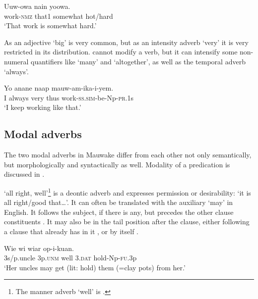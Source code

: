 \ea%
\label{ex:3:x703}
\gll Uuw-owa nain   yoowa. \\
work-\textsc{nmz} that1 somewhat hot/hard\\
\glt`That work is somewhat hard.'
\z

As an adjective  `big' is very common, but as an intensity adverb `very' it is very restricted in its distribution.  cannot modify a verb, but it can intensify some non-numeral quantifiers like  `many' and  `altogether', as well as the temporal adverb  `always'. 

\ea%
\label{ex:3:x509}
\gll Yo anane  naap mauw-am-ika-i-yem. \\
I always very thus work-\textsc{ss}.\textsc{sim}-be-Np-\textsc{pr}.1s\\
\glt`I  keep working like that.'
\z

\subsection{Modal adverbs}\label{sec:3:y:x}
{}
The two modal adverbs in Mauwake differ from each other not only semantically, but morphologically and syntactically as well. Modality of a predication is discussed in .

 `all right, well'\footnote{The manner adverb `well' is .} is a deontic adverb and expresses permission or desirability: `it is all right/good that{\dots}'. It can often be translated with the auxiliary `may' in English. It follows the subject, if there is any, but precedes the other clause constituents . It may also be in the tail position after the clause, either following a clause that already has  in it , or by itself . 

\ea%
\label{ex:3:x514}
\gll Wie wi  wiar op-i-kuan. \\
3s/p.uncle 3p.\textsc{unm} well 3.\textsc{dat} hold-Np-\textsc{fu}.3p\\
\glt`Her uncles may get (lit: hold) them (=clay pots) from her.' 
\z

